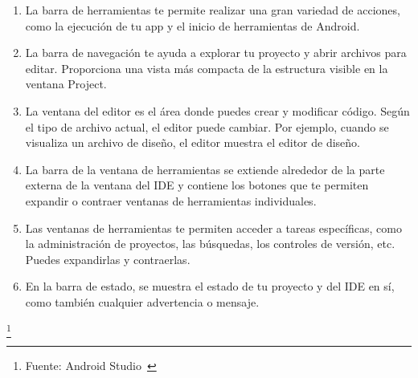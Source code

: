 \begin{enumerate}
\item La barra de herramientas te permite realizar una gran
 variedad de acciones, como la ejecución de tu app y el inicio
 de herramientas de Android.
\item La barra de navegación te ayuda a explorar tu 
proyecto y abrir archivos para editar. Proporciona una 
vista más compacta de la estructura visible en la ventana Project.
\item La ventana del editor es el área donde puedes 
crear y modificar código. Según el tipo de archivo actual,
 el editor puede cambiar. Por ejemplo, cuando se visualiza
 un archivo de diseño, el editor muestra el editor de diseño.
\item La barra de la ventana de herramientas se extiende 
alrededor de la parte externa de la ventana del IDE y 
contiene los botones que te permiten expandir o contraer
 ventanas de herramientas individuales.
\item Las ventanas de herramientas te permiten acceder a 
tareas específicas, como la administración de proyectos,
 las búsquedas, los controles de versión, etc. Puedes 
expandirlas y contraerlas.
\item En la barra de estado, se muestra el estado de tu 
proyecto y del IDE en sí, como también cualquier advertencia 
o mensaje.
\end{enumerate}
\footnote{Fuente: Android Studio~\cite{ANDROIDSTUDIO}}